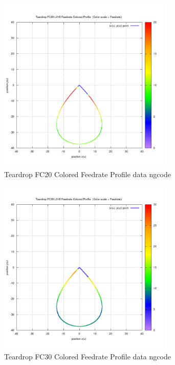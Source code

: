 \begin{figure}
	\caption     {Teardrop FC20 Colored Feedrate Profile data ngcode}
	\label{18-img-Teardrop-FC20-Colored-Feedrate-Profile-data_ngcode.png}
	\includegraphics[width=0.75\textwidth]{Chap4/appendix/app-Teardrop/plots/18-img-Teardrop-FC20-Colored-Feedrate-Profile-data_ngcode.png}
\end{figure}

\clearpage
\pagebreak

\begin{figure}
	\caption     {Teardrop FC30 Colored Feedrate Profile data ngcode}
	\label{19-img-Teardrop-FC30-Colored-Feedrate-Profile-data_ngcode.png}
	\includegraphics[width=0.75\textwidth]{Chap4/appendix/app-Teardrop/plots/19-img-Teardrop-FC30-Colored-Feedrate-Profile-data_ngcode.png}
\end{figure}



